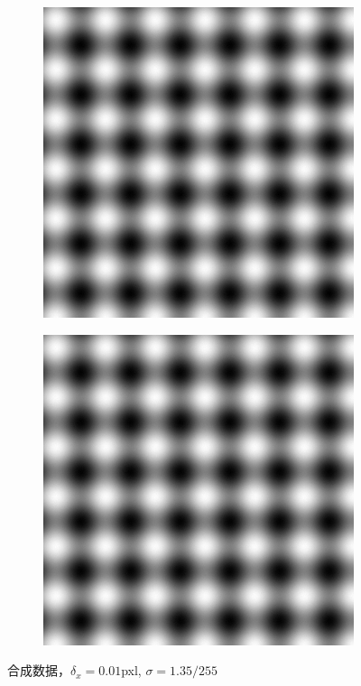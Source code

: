 \begin{figure}[tb]\begin{center}
    \begin{subfigure}[b]{.35\figwidth}
        \centering
        \includegraphics[width=.35\figwidth]{res/synth0.png}
    \end{subfigure}
    \begin{subfigure}[b]{.35\figwidth}
        \centering
        \includegraphics[width=.35\figwidth]{res/synth1.png}
    \end{subfigure}
    \caption{合成数据，$\delta_x = 0.01$pxl, $\sigma = 1.35/255$}
    \label{fig:synthesis}
\end{center}\end{figure}

